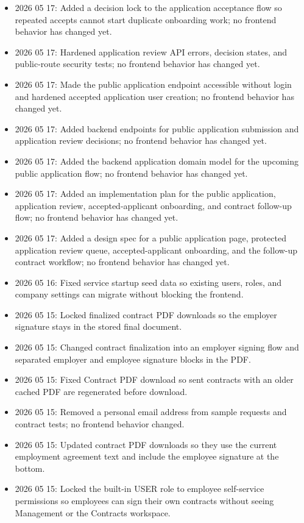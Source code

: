 \documentclass[11pt]{article}
\begin{document}
\begin{itemize}
    \item 2026 05 17: Added a decision lock to the application acceptance flow so repeated accepts cannot start duplicate onboarding work; no frontend behavior has changed yet.
    \item 2026 05 17: Hardened application review API errors, decision states, and public-route security tests; no frontend behavior has changed yet.
    \item 2026 05 17: Made the public application endpoint accessible without login and hardened accepted application user creation; no frontend behavior has changed yet.
    \item 2026 05 17: Added backend endpoints for public application submission and application review decisions; no frontend behavior has changed yet.
    \item 2026 05 17: Added the backend application domain model for the upcoming public application flow; no frontend behavior has changed yet.
    \item 2026 05 17: Added an implementation plan for the public application, application review, accepted-applicant onboarding, and contract follow-up flow; no frontend behavior has changed yet.
    \item 2026 05 17: Added a design spec for a public application page, protected application review queue, accepted-applicant onboarding, and the follow-up contract workflow; no frontend behavior has changed yet.
    \item 2026 05 16: Fixed service startup seed data so existing users, roles, and company settings can migrate without blocking the frontend.
    \item 2026 05 15: Locked finalized contract PDF downloads so the employer signature stays in the stored final document.
    \item 2026 05 15: Changed contract finalization into an employer signing flow and separated employer and employee signature blocks in the PDF.
    \item 2026 05 15: Fixed Contract PDF download so sent contracts with an older cached PDF are regenerated before download.
    \item 2026 05 15: Removed a personal email address from sample requests and contract tests; no frontend behavior changed.
    \item 2026 05 15: Updated contract PDF downloads so they use the current employment agreement text and include the employee signature at the bottom.
    \item 2026 05 15: Locked the built-in USER role to employee self-service permissions so employees can sign their own contracts without seeing Management or the Contracts workspace.

\end{itemize}
\end{document}
